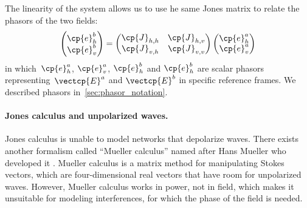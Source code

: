 \begin{refsection}
The linearity of the system allows us to use he same Jones matrix to relate the phasors of the two fields:
\begin{equation}
    \begin{pmatrix}
        \cp{e}^b_h\\
        \cp{e}^b_v
    \end{pmatrix}
    =
    \begin{pmatrix}
        \cp{J}_{h, h}   &   \cp{J}_{h, v} \\
        \cp{J}_{v, h}   &   \cp{J}_{v, v}
    \end{pmatrix}
    \begin{pmatrix}
        \cp{e}^a_h\\
        \cp{e}^a_v
    \end{pmatrix}
\end{equation}
in which~$\cp{e}^a_h$, $\cp{e}^a_v$, $\cp{e}^b_h$ and $\cp{e}^b_h$ are scalar phasors
representing~$\vectcp{E}^a$ and $\vectcp{E}^b$ in specific reference frames.
We described phasors in~\vref{sec:phasor_notation}.

\paragraph{Jones calculus and unpolarized waves.}
\label{sec:jones_unpolarized}
Jones calculus is unable to model networks that depolarize waves.
There exists another formalism called ``Mueller calculus'' named after Hans Mueller who developed it \parencite{mueller1943memorandum}.
Mueller calculus is a matrix method for manipulating Stokes vectors, which are four-dimensional real vectors that have room for unpolarized waves.
However, Mueller calculus works in power, not in field, which makes it unsuitable for modeling interferences, for which the phase of the field is needed.


\end{refsection}
